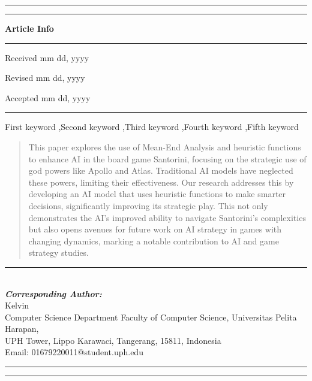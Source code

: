 \documentclass{telkomnika}
\begin{document}
\hrule
\vspace{.1em}
\hrule
\vspace{.5em}
\noindent
\parbox[t][][s]{0.315\textwidth}{%
\textbf{Article Info}
\vspace{.5em}
\hrule
\vspace{.5em}
\begin{history}
\vspace{.5em}

Received mm dd, yyyy

Revised mm dd, yyyy

Accepted mm dd, yyyy

\vspace{.7em}
\end{history}
\vspace{.5em}
\hrule
\vspace{.5em}
\begin{keyword} 
\vspace{.5em}
First keyword \sep Second keyword \sep Third keyword \sep Fourth keyword \sep Fifth keyword
\vspace{.5em}
\end{keyword}
\vspace{\fill}
}
\parbox{0.020\textwidth}{\hspace{.5em}}
\parbox[t][][s]{0.65\textwidth}{%
\begin{abstract}
\vspace{.3em}
This paper explores the use of Mean-End Analysis and heuristic functions to enhance AI in the board game Santorini, focusing on the strategic use of god powers like Apollo and Atlas. Traditional AI models have neglected these powers, limiting their effectiveness. Our research addresses this by developing an AI model that uses heuristic functions to make smarter decisions, significantly improving its strategic play. This not only demonstrates the AI's improved ability to navigate Santorini's complexities but also opens avenues for future work on AI strategy in games with changing dynamics, marking a notable contribution to AI and game strategy studies.
\end{abstract}
}
\parbox[l]{\textwidth}{%
\rule{0.275\textwidth}{0.5pt} \hspace{0.5cm} \hrulefill
\\
\emph{\textbf{Corresponding Author:}}
\vspace{.5em}\\
Kelvin\\
Computer Science Department Faculty of Computer Science, Universitas Pelita Harapan,\\
UPH Tower, Lippo Karawaci, Tangerang, 15811, Indonesia\\
Email: 01679220011@student.uph.edu
}
\vspace{.5em}
\hrule
\vspace{.1em}
\hrule
\end{document}
